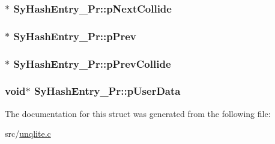 \hypertarget{struct_sy_hash_entry___pr_afb47688543dd56806878c25f1d5d8763}{
\subsubsection[{p\-Next\-Collide}]{$\ast$ Sy\-Hash\-Entry\-\_\-\-Pr\-::p\-Next\-Collide}}\label{da/dbc/struct_sy_hash_entry___pr_afb47688543dd56806878c25f1d5d8763}
\hypertarget{struct_sy_hash_entry___pr_a7423a9ca375d103784c71caf7a1cf1f3}{
\subsubsection[{p\-Prev}]{ $\ast$ Sy\-Hash\-Entry\-\_\-\-Pr\-::p\-Prev}}\label{da/dbc/struct_sy_hash_entry___pr_a7423a9ca375d103784c71caf7a1cf1f3}
\hypertarget{struct_sy_hash_entry___pr_aa099b84a7316d5322967d041dcebcce7}{
\subsubsection[{p\-Prev\-Collide}]{ $\ast$ Sy\-Hash\-Entry\-\_\-\-Pr\-::p\-Prev\-Collide}}\label{da/dbc/struct_sy_hash_entry___pr_aa099b84a7316d5322967d041dcebcce7}
\hypertarget{struct_sy_hash_entry___pr_aa64d3bb9514290195374bb7b609a4ca5}{
\subsubsection[{p\-User\-Data}]{\setlength{\rightskip}{0pt plus 5cm}void$\ast$ Sy\-Hash\-Entry\-\_\-\-Pr\-::p\-User\-Data}}\label{da/dbc/struct_sy_hash_entry___pr_aa64d3bb9514290195374bb7b609a4ca5}


The documentation for this struct was generated from the following file\-:\begin{DoxyCompactItemize}
\item 
src/\hyperlink{unqlite_8c}{unqlite.\-c}\end{DoxyCompactItemize}
